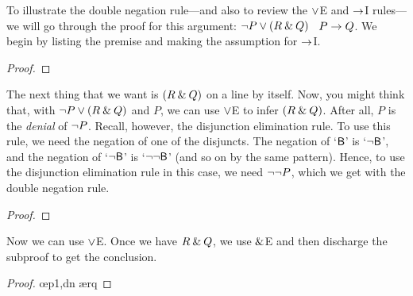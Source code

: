 
To illustrate the double negation rule---and also to review the $\vee$E and $\rightarrow$I rules---we will go through the proof for this argument: ${\neg} P \vee (R \mathbin{\&} Q)$ \therefore\ $P \rightarrow Q$. We begin by listing the premise and making the assumption for $\rightarrow$I.

\begin{proof}
	 	
	\open
\end{proof}
The next thing that we want is $(R \mathbin{\&} Q)$ on a line by itself. Now, you might think that, with ${\neg} P \vee (R \mathbin{\&} Q)$ and $P$, we can use $\vee$E to infer $(R \mathbin{\&} Q)$. After all, $P$ is the \textit{denial} of ${\neg} P$. Recall, however, the disjunction elimination rule.
\noindent To use this rule, we need the negation of one of the disjuncts. The negation of `$\mathsf{B}$' is `${\neg}\mathsf{B}$', and the negation of 
`${\neg}\mathsf{B}$' is `${\neg}{\neg}\mathsf{B}$' (and so on by the same pattern). Hence, to use the disjunction elimination rule in this case, we need ${\neg}{\neg} P$, which we get with the double negation rule.

\begin{proof}
	 	
	\open
		 
\end{proof}
Now we can use $\vee$E. Once we have $R \mathbin{\&} Q$, we use $\mathbin{\&}$E and then discharge the subproof to get the conclusion.

\begin{proof}
	 	
	\open
		 
		 \oe{p1,dn}
		 \ae{rq}
	\close
\end{proof}




